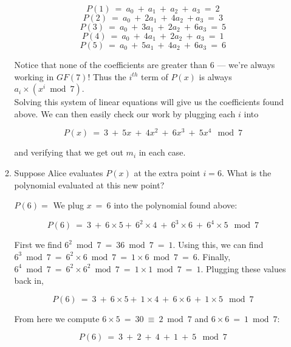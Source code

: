 \documentclass[11pt,preview]{standalone} %
\begin{document}
\begin{enumerate}
\begin{enumerate}
\begin{Freeform}{5}
    $$P(1)\ =\ a_0\ +\ a_1\ +\ a_2\ +\ a_3\ =\ 2$$
    $$P(2)\ =\ a_0\ +\ 2 a_1\ +\ 4 a_2\ + a_3\ =\ 3$$
    $$P(3)\ =\ a_0\ +\ 3 a_1\ +\ 2 a_2\ +\ 6 a_3\ =\ 5$$
    $$P(4)\ =\ a_0\ +\ 4 a_1\ +\ 2 a_2\ +\ a_3\ =\ 1$$
    $$P(5)\ =\ a_0\ +\ 5 a_1\ +\ 4 a_2\ +\ 6 a_3\ =\ 6$$

    Notice that none of the coefficients are greater than $6$ --- we're always working in $GF(7)$! Thus the $i^{th}$ term of $P(x)$ is always $a_i \times (x^{i} \bmod 7)$.\\

    Solving this system of linear equations will give us the coefficients found above. We can then easily check our work by plugging each $i$ into

    $$P(x)\ =\ 3\ +\ 5 x\ +\ 4 x^2\ +\ 6 x^3\ +\ 5 x^4\ \bmod 7$$

    and verifying that we get out $m_i$ in each case.

    \end{Freeform}
    \item Suppose Alice evaluates $P(x)$ at the extra point $i = 6$. What is the polynomial evaluated at this new point?
    \begin{Freeform}{1}
    $P(6) = $
    \Solution We plug $x\ =\ 6$ into the polynomial found above:

    $$P(6)\ =\ 3\ +\ 6 \times 5 +\ 6^2 \times 4\ +\ 6^3 \times 6\ +\ 6^4 \times 5\ \bmod 7$$

    First we find $6^2 \bmod 7\ =\ 36 \bmod 7\ =\ 1$. Using this, we can find $6^3 \bmod 7\ =\ 6^2 \times 6 \bmod 7\ =\ 1 \times 6 \bmod 7\ =\ 6$. Finally, $6^4 \bmod 7\ =\ 6^2 \times 6^2 \bmod 7\ =\ 1 \times 1 \bmod 7\ =\ 1$. Plugging these values back in,

    $$P(6)\ =\ 3\ +\ 6 \times 5 +\ 1 \times 4\ +\ 6 \times 6\ +\ 1 \times 5\ \bmod 7$$

    From here we compute $6 \times 5\ =\ 30\ \equiv\ 2 \bmod 7$ and $6 \times 6\ =\ 1 \bmod 7$:

    $$P(6)\ =\ 3\ +\ 2\ +\ 4\ +\ 1\ +\ 5\ \bmod 7$$


\end{Freeform}
\end{enumerate}
\end{enumerate}
\end{document}
